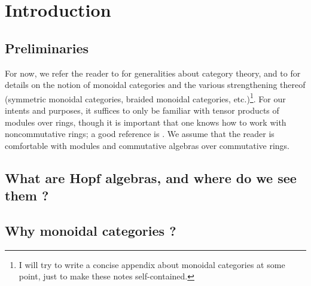 \section{Introduction}
    \subsection{Preliminaries}
        For now, we refer the reader to \cite{maclane} for generalities about category theory, and to \cite{EGNO_tensor_categories} for details on the notion of monoidal categories and the various strengthening thereof (symmetric monoidal categories, braided monoidal categories, etc.)\footnote{I will try to write a concise appendix about monoidal categories at some point, just to make these notes self-contained.}. For our intents and purposes, it suffices to only be familiar with tensor products of modules over rings, though it is important that one knows how to work with noncommutative rings; a good reference is \cite{lam_first_course_in_noncommutative_rings}. We assume that the reader is comfortable with modules and commutative algebras over commutative rings.

    \subsection{What are Hopf algebras, and where do we see them ?}

    \subsection{Why monoidal categories ?}